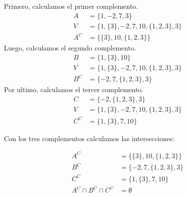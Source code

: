 \documentclass{article}
\begin{document}
\begin{enumerate}[label=\roman*)]
    Primero, calculamos el primer complemento.
    \begin{align*}
        A &= \{1,-2,7,3\}\\
        V &= \{1, \{3\}, -2, 7, 10, \{1,2,3\},3\}\\
        A^{C} &= \{\{3\}, 10,  \{1,2,3\}\} 
    \end{align*}
    Luego, calculamos el segundo complemento.
    \begin{align*}
        B &= \{1,\{3\}, 10\}\\
        V &= \{1, \{3\}, -2, 7, 10, \{1,2,3\},3\}\\
        B^{C} &= \{-2, 7, \{1,2,3\}, 3\}
    \end{align*}
    Por ultimo, calculamos el tercer complemento. 
    \begin{align*}
        C &= \{-2, \{1,2,3\}, 3\}\\
        V &= \{1, \{3\}, -2, 7, 10, \{1,2,3\}, 3\}\\
        C^{C} &= \{1, \{3\}, 7, 10\}
    \end{align*}

    Con los tres complementos calculamos las intersecciones:

    \begin{align*}
        A^{C} &= \{\{3\}, 10, \{1,2,3\}\}\\
        B^{C} &= \{-2, 7, \{1,2,3\}, 3\}\\
        C^{C} &= \{1, \{3\}, 7, 10\}\\
        A^{C} \cap B^{C} \cap C^{C} &= \emptyset
    \end{align*}
\end{enumerate}
\end{document}
